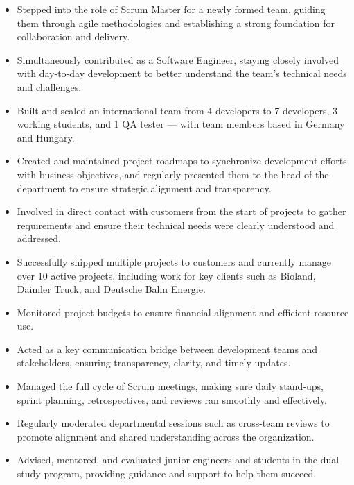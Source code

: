 \documentclass[10pt, a4paper]{cvhari}
\begin{document}
    \begin{itemize}
        \item Stepped into the role of Scrum Master for a newly formed team, guiding them through agile methodologies and establishing a strong foundation for collaboration and delivery.

        \item Simultaneously contributed as a Software Engineer, staying closely involved with day-to-day development to better understand the team’s technical needs and challenges.

        \item Built and scaled an international team from 4 developers to 7 developers, 3 working students, and 1 QA tester — with team members based in Germany and Hungary.

        \item Created and maintained project roadmaps to synchronize development efforts with business objectives, and regularly presented them to the head of the department to ensure strategic alignment and transparency.

        \item Involved in direct contact with customers from the start of projects to gather requirements and ensure their technical needs were clearly understood and addressed.

        \item Successfully shipped multiple projects to customers and currently manage over 10 active projects, including work for key clients such as Bioland, Daimler Truck, and Deutsche Bahn Energie.

        \item Monitored project budgets to ensure financial alignment and efficient resource use.

        \item Acted as a key communication bridge between development teams and stakeholders, ensuring transparency, clarity, and timely updates.

        \item Managed the full cycle of Scrum meetings, making sure daily stand-ups, sprint planning, retrospectives, and reviews ran smoothly and effectively.

        \item Regularly moderated departmental sessions such as cross-team reviews to promote alignment and shared understanding across the organization.

        \item Advised, mentored, and evaluated junior engineers and students in the dual study program, providing guidance and support to help them succeed.
        
    \end{itemize}
\end{document}
